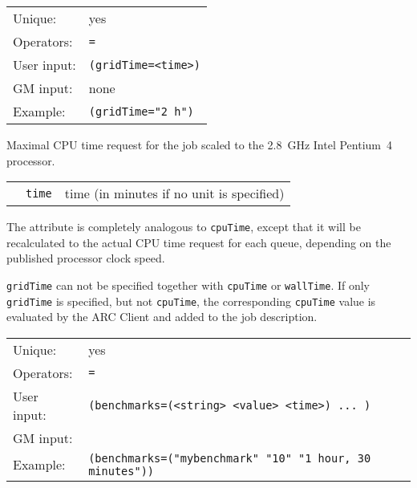   \hspace*{0.5cm}
  \begin{shaded}
  \end{shaded}
  \begin{tabular}{lp{13cm}}
    Unique:&yes\\
    Operators:&\verb#=#\\
    User input:&\verb#(gridTime=<time>)#\\
    GM input:& none\\
    Example:&\verb#(gridTime="2 h")#\\
  \end{tabular}

  Maximal CPU time request for the job scaled to the 2.8~GHz
  Intel\textsuperscript{\textregistered}
  Pentium\textsuperscript{\textregistered}~4 processor.

  \begin{tabular}{llp{10cm}}
    \hspace*{1cm}&\texttt{time} & time (in minutes if no unit is specified)\\
  \end{tabular}
  
  The attribute is completely analogous to \texttt{cpuTime}, except
  that it will be recalculated to the actual CPU time request for each
  queue, depending on the published processor clock speed.
  
  \texttt{gridTime} can not be specified together with \texttt{cpuTime}
  or \texttt{wallTime}. If only \texttt{gridTime} is specified, but not \texttt{cpuTime},
  the corresponding  \texttt{cpuTime} value is evaluated by the ARC Client and added to the job description.

  \hspace*{0.5cm}
  \begin{shaded}
  \end{shaded}
  \begin{tabular}{lp{13cm}}
    Unique:&yes\\
    Operators:&\verb#=#\\
    User input:&\verb#(benchmarks=(<string> <value> <time>) ... )#\\
    GM input:&\\
    Example:&\verb#(benchmarks=("mybenchmark" "10" "1 hour, 30 minutes"))#\\
  \end{tabular}

